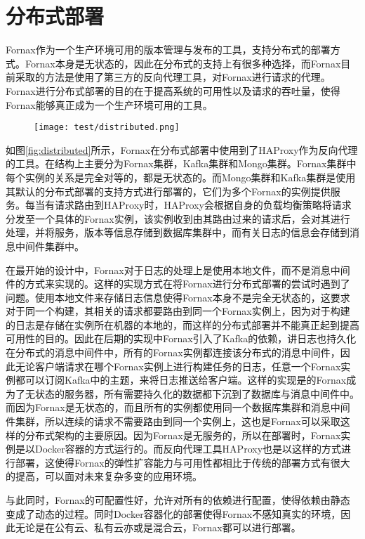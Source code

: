 \section{分布式部署}

Fornax作为一个生产环境可用的版本管理与发布的工具，支持分布式的部署方式。Fornax本身是无状态的，因此在分布式的支持上有很多种选择，而Fornax目前采取的方法是使用了第三方的反向代理工具，对Fornax进行请求的代理。Fornax进行分布式部署的目的在于提高系统的可用性以及请求的吞吐量，使得Fornax能够真正成为一个生产环境可用的工具。

\begin{figure}[!htp]
  \centering
  \texttt{[image: test/distributed.png]}
\end{figure}

如图\ref{fig:distributed}所示，Fornax在分布式部署中使用到了HAProxy作为反向代理的工具。在结构上主要分为Fornax集群，Kafka集群和Mongo集群。Fornax集群中每个实例的关系是完全对等的，都是无状态的。而Mongo集群和Kafka集群是使用其默认的分布式部署的支持方式进行部署的，它们为多个Fornax的实例提供服务。每当有请求路由到HAProxy时，HAProxy会根据自身的负载均衡策略将请求分发至一个具体的Fornax实例，该实例收到由其路由过来的请求后，会对其进行处理，并将服务，版本等信息存储到数据库集群中，而有关日志的信息会存储到消息中间件集群中。

在最开始的设计中，Fornax对于日志的处理上是使用本地文件，而不是消息中间件的方式来实现的。这样的实现方式在将Fornax进行分布式部署的尝试时遇到了问题。使用本地文件来存储日志信息使得Fornax本身不是完全无状态的，这要求对于同一个构建，其相关的请求都要路由到同一个Fornax实例上，因为对于构建的日志是存储在实例所在机器的本地的，而这样的分布式部署并不能真正起到提高可用性的目的。因此在后期的实现中Fornax引入了Kafka的依赖，讲日志也持久化在分布式的消息中间件中，所有的Fornax实例都连接该分布式的消息中间件，因此无论客户端请求在哪个Fornax实例上进行构建任务的日志，任意一个Fornax实例都可以订阅Kafka中的主题，来将日志推送给客户端。这样的实现是的Fornax成为了无状态的服务器，所有需要持久化的数据都下沉到了数据库与消息中间件中。而因为Fornax是无状态的，而且所有的实例都使用同一个数据库集群和消息中间件集群，所以连续的请求不需要路由到同一个实例上，这也是Fornax可以采取这样的分布式架构的主要原因。因为Fornax是无服务的，所以在部署时，Fornax实例是以Docker容器的方式运行的。而反向代理工具HAProxy也是以这样的方式进行部署，这使得Fornax的弹性扩容能力与可用性都相比于传统的部署方式有很大的提高，可以面对未来复杂多变的应用环境。

与此同时，Fornax的可配置性好，允许对所有的依赖进行配置，使得依赖由静态变成了动态的过程。同时Docker容器化的部署使得Fornax不感知真实的环境，因此无论是在公有云、私有云亦或是混合云，Fornax都可以进行部署。

